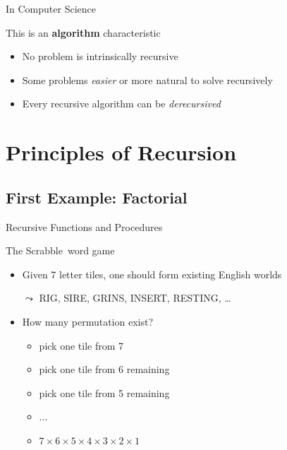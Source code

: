 \begin{Coupe}
\begin{frame}{In Computer Science}
  \begin{block}{This is an \textbf{algorithm} characteristic}
    \begin{itemize}
    \item No problem is intrinsically recursive 
    \item Some problems \textit{easier} or more natural to solve recursively
    \item Every recursive algorithm can be \textit{derecursived}
    \end{itemize}
  \end{block}
\end{frame}
\section{Principles of Recursion}
\mypartpage
\subsection{First Example: Factorial}
\begin{frame}{Recursive Functions and Procedures}
  
  \bigskip

  \begin{block}{The Scrabble\texttrademark\ word game}
    \begin{itemize}
    \item Given 7 letter tiles, one should form existing English worlds

          
        $\leadsto$ RIG, SIRE, GRINS, INSERT,
      RESTING, \ldots 

    \item How many permutation exist?
      \begin{itemize}
      \item {} pick one tile from 7
      \item {} pick one tile from 6 remaining
      \item {} pick one tile from 5 remaining
      \item ...
      \item {} $7\times6\times5\times4\times3\times2\times1$
      \end{itemize}
    \end{itemize}
  \end{block}


\end{frame}
\end{Coupe}
